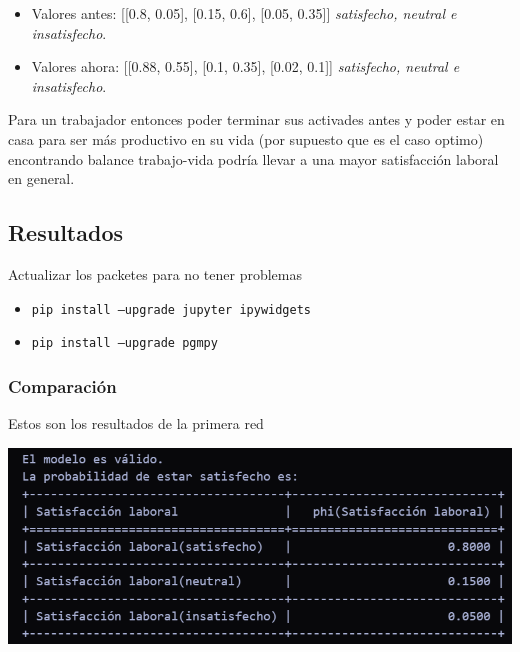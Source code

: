 \begin{itemize}
    \item Valores antes: [[0.8, 0.05], [0.15, 0.6], [0.05, 0.35]] \textit{satisfecho, neutral e insatisfecho}.
    \item Valores ahora: [[0.88, 0.55], [0.1, 0.35], [0.02, 0.1]] \textit{satisfecho, neutral e insatisfecho}.
\end{itemize}

Para un trabajador entonces poder terminar sus activades antes y poder estar en casa para ser 
más productivo en su vida (por supuesto que es el caso optimo) encontrando balance trabajo-vida podría 
llevar a una mayor satisfacción laboral en general.

\subsection{Resultados}

Actualizar los packetes para no tener problemas 
\begin{itemize}
    \item \texttt{pip install --upgrade jupyter ipywidgets}
    \item \texttt{pip install --upgrade pgmpy}
\end{itemize}


\subsubsection*{Comparación}

Estos son los resultados de la primera red 
\begin{center}
    \includegraphics[scale = .6]{IMA/ejecucionRedBayesina.png}
\end{center}

